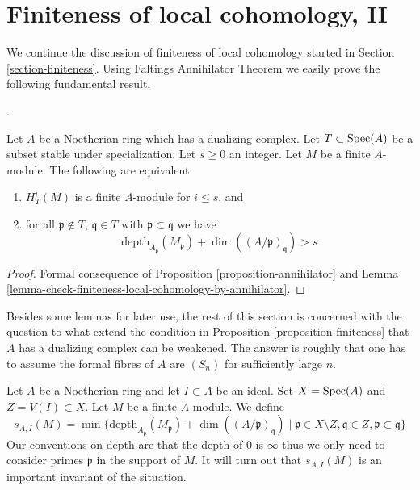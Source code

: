 \section{Finiteness of local cohomology, II}
\label{section-finiteness-II}

\noindent
We continue the discussion of finiteness of local cohomology started in
Section \ref{section-finiteness}. Using
Faltings Annihilator Theorem
we easily prove the following fundamental result.

\begin{proposition}
\label{proposition-finiteness}
\begin{reference}
\cite{Faltings-annulators}.
\end{reference}
Let $A$ be a Noetherian ring which has a dualizing complex.
Let $T \subset \mathop{\mathrm{Spec}}(A)$ be a subset stable under specialization.
Let $s \geq 0$ an integer. Let $M$ be a finite $A$-module.
The following are equivalent
\begin{enumerate}
\item $H^i_T(M)$ is a finite $A$-module for $i \leq s$, and
\item for all $\mathfrak p \not \in T$, $\mathfrak q \in T$ with
$\mathfrak p \subset \mathfrak q$ we have
$$
\text{depth}_{A_\mathfrak p}(M_\mathfrak p) +
\dim((A/\mathfrak p)_\mathfrak q) > s
$$
\end{enumerate}
\end{proposition}

\begin{proof}
Formal consequence of Proposition \ref{proposition-annihilator} and
Lemma \ref{lemma-check-finiteness-local-cohomology-by-annihilator}.
\end{proof}

\noindent
Besides some lemmas for later use, the rest of this section is
concerned with the question to what extend the condition in
Proposition \ref{proposition-finiteness}
that $A$ has a dualizing complex can be weakened. The answer is roughly
that one has to assume the formal fibres of $A$ are $(S_n)$
for sufficiently large $n$.

\medskip\noindent
Let $A$ be a Noetherian ring and let $I \subset A$ be an ideal.
Set $X = \mathop{\mathrm{Spec}}(A)$ and $Z = V(I) \subset X$. Let $M$ be a finite $A$-module.
We define
\begin{equation}
\label{equation-cutoff}
s_{A, I}(M) =
\min \{
\text{depth}_{A_\mathfrak p}(M_\mathfrak p) + \dim((A/\mathfrak p)_\mathfrak q)
\mid
\mathfrak p \in X \setminus Z, \mathfrak q \in Z,
\mathfrak p \subset \mathfrak q
\}
\end{equation}
Our conventions on depth are that the depth of $0$ is $\infty$
thus we only need to consider primes $\mathfrak p$ in the support
of $M$. It will turn out that $s_{A, I}(M)$ is an important invariant of
the situation.

